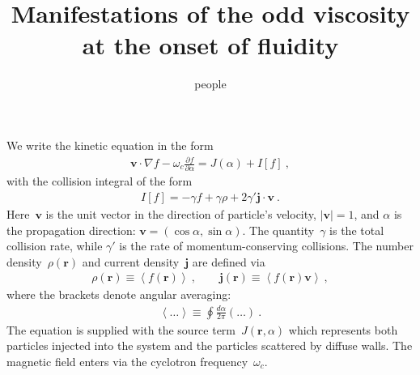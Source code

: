 \documentclass[preprint,aps,eqsecnum]{revtex4-1}
\begin{document}
\title{Manifestations of the odd viscosity at the onset of fluidity}
\author{people}
\maketitle

We write the kinetic equation in the form
\begin{align}
  {\bm v} \cdot\nabla f - \omega_c \frac{\partial f}{\partial \alpha}
  = J(\alpha) + I[f]\ , 
\end{align}
with the collision integral of the form
\begin{align}
  I[f] = -\gamma f +  \gamma \rho + 2 \gamma' {\bm j}\cdot {\bm v}\ .
\end{align}
Here~${\bm v}$ is the unit vector in the direction of particle's
velocity, $|{\bm v}| = 1$, and $\alpha$ is the propagation
direction: ${\bm v} = (\cos\alpha, \sin\alpha)$.
The quantity~$\gamma$ is the total collision rate, while
$\gamma'$ is the rate of momentum-conserving collisions.
The number density~${\rho}({\bm r})$ and current density~${\bm j}$
are defined via
\begin{align}
  \rho({\bm r}) \equiv \left\langle f({\bm r}) \right\rangle \ ,
  \qquad
  {\bm j}({\bm r}) \equiv \left\langle f({\bm r}) {\bm v} \right\rangle\ , 
\end{align}
where the brackets denote angular averaging:
\begin{align}
  \left\langle \ldots \right\rangle \equiv \oint \frac{d\alpha}{2\pi} (\ldots)\ .
\end{align}
The equation is supplied with the source term~$J({\bm r}, \alpha)$
which represents both particles injected into the system and
the particles scattered by diffuse walls. The magnetic field
enters via the cyclotron frequency~$\omega_c$.
\end{document}
